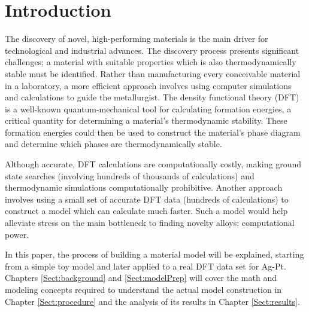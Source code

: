 \chapter{Introduction}\label{Sect:intro}
\par The discovery of novel, high-performing materials is the main driver for technological and industrial advances. The discovery process presents significant challenges; a material with suitable properties which is also thermodynamically stable must be identified. Rather than manufacturing every conceivable material in a laboratory, a more efficient approach involves using computer simulations and calculations to guide the metallurgist.  The density functional theory (DFT) is a well-known quantum-mechanical tool for calculating formation energies, a critical quantity for determining a material's thermodynamic stability.  These formation energies could then be used to construct the material's phase diagram and determine which phases are thermodynamically stable. 
\par Although accurate, DFT calculations are computationally costly, making ground state searches (involving hundreds of thousands of calculations) and thermodynamic simulations computationally prohibitive. Another approach involves using a small set of accurate DFT data (hundreds of calculations) to construct a model which can calculate much faster.  Such a model would help alleviate stress on the main bottleneck to finding novelty alloys: computational power. 
\par In this paper, the process of building a material model will be explained, starting from a simple toy model and later applied to a real DFT data set for Ag-Pt. Chapters \ref{Sect:background} and \ref{Sect:modelPrep} will cover the math and modeling concepts required to understand the actual model construction in Chapter \ref{Sect:procedure} and the analysis of its results in Chapter \ref{Sect:results}. 